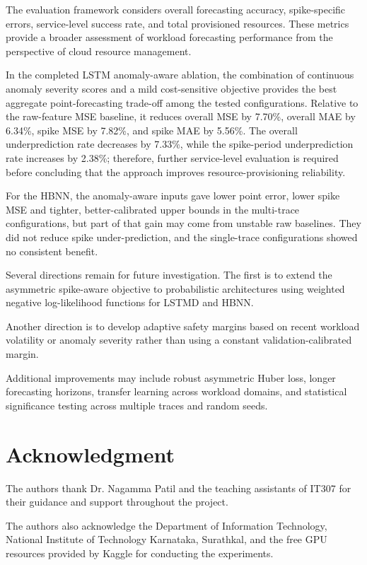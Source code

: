 \documentclass[conference]{IEEEtran}
\begin{document}
The evaluation framework considers overall forecasting accuracy, spike-specific errors, service-level success rate, and total provisioned resources. These metrics provide a broader assessment of workload forecasting performance from the perspective of cloud resource management.

In the completed LSTM anomaly-aware ablation, the combination of continuous anomaly severity scores and a mild cost-sensitive objective provides the best aggregate point-forecasting trade-off among the tested configurations. Relative to the raw-feature MSE baseline, it reduces overall MSE by 7.70\%, overall MAE by 6.34\%, spike MSE by 7.82\%, and spike MAE by 5.56\%. The overall underprediction rate decreases by 7.33\%, while the spike-period underprediction rate increases by 2.38\%; therefore, further service-level evaluation is required before concluding that the approach improves resource-provisioning reliability.

For the HBNN, the anomaly-aware inputs gave lower point error, lower spike MSE and tighter, better-calibrated upper bounds in the multi-trace configurations, but part of that gain may come from unstable raw baselines. They did not reduce spike under-prediction, and the single-trace configurations showed no consistent benefit.

Several directions remain for future investigation. The first is to extend the asymmetric spike-aware objective to probabilistic architectures using weighted negative log-likelihood functions for LSTMD and HBNN.

Another direction is to develop adaptive safety margins based on recent workload volatility or anomaly severity rather than using a constant validation-calibrated margin.

Additional improvements may include robust asymmetric Huber loss, longer forecasting horizons, transfer learning across workload domains, and statistical significance testing across multiple traces and random seeds.

\section*{Acknowledgment}

The authors thank Dr. Nagamma Patil and the teaching assistants of IT307 for their guidance and support throughout the project.

The authors also acknowledge the Department of Information Technology, National Institute of Technology Karnataka, Surathkal, and the free GPU resources provided by Kaggle for conducting the experiments.
\end{document}
